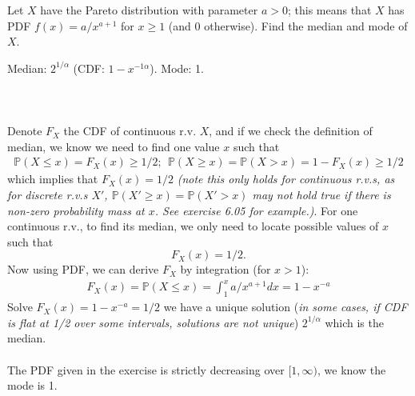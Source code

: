 
\setcounter{theorem}{2}
\begin{exercise} [BH.6.3] Let $X$ have the Pareto distribution with parameter $a > 0$; this means that $X$ has PDF $f(x) = a/ x^{a+1}$ for $x \geq 1$ (and 0 otherwise). Find the median and mode of $X$.

\begin{solution}
    Median: $2^{1/\alpha}$ (CDF: $1-x^{-1\alpha}$). Mode: 1.\\~\\
	\\~\\
	Denote $F_X$ the CDF of continuous r.v. $X$, and if we check the definition of median, we know we need to find one value $x$ such that 
	\begin{align}
		\mathbb{P}(X\leq x)= F_X(x) \geq 1/2;~~ \mathbb{P}(X\geq x)=\mathbb{P}(X > x) =1-F_X(x) \geq 1/2
	\end{align}
	which implies that $F_X(x)=1/2$ \textit{(note this only holds for continuous r.v.s, as for discrete r.v.s $X'$, $\mathbb{P}(X'\geq x)=\mathbb{P}(X' > x)$ may not hold true if there is non-zero probability mass at $x$. See exercise 6.05 for example.)}. For one continuous r.v., to find its median, we only need to locate possible values of $x$ such that $$F_X(x)=1/2.$$  
	Now using PDF, we can derive $F_X$ by integration (for $x>1$):
	\begin{align*}
		F_X(x)=\mathbb{P}\left(X\leq x\right) = \int_{1}^{x} a/x^{a+1} dx =1-x^{-a}
	\end{align*}
	Solve $F_X(x)=1-x^{-a}=1/2$ we have a unique solution (\textit{in some cases, if CDF is flat at 1/2 over some intervals, solutions are not unique}) $2^{1/\alpha}$ which is the median. \\~\\
	The PDF given in the exercise is strictly decreasing over $[1,\infty)$, we know the mode is 1.
\end{solution}
\end{exercise}

